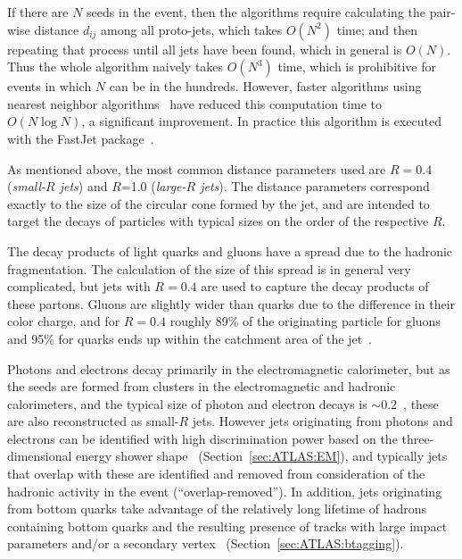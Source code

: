 If there are $N$ seeds in the event, then the \kt{} algorithms require calculating the pair-wise distance $d_{ij}$ among all proto-jets, which takes $O(N^2)$ time; and then repeating that process until all jets have been found, which in general is $O(N)$.
Thus the whole algorithm naively takes $O(N^3)$ time, which is prohibitive for events in which $N$ can be in the hundreds.
However, faster algorithms using nearest neighbor algorithms~\cite{Cacciari:2005hq} have reduced this computation time to $O(N\log N)$, a significant improvement.
In practice this algorithm is executed with the FastJet package~\cite{Cacciari:2011ma}.

As mentioned above, the most common distance parameters used are $R=0.4$ (\textit{small-$R$ jets}) and $R$=1.0 (\textit{large-$R$ jets}).
The distance parameters correspond exactly to the size of the circular cone formed by the jet, and are intended to target the decays of particles with typical sizes on the order of the respective $R$.

The decay products of light quarks and gluons have a spread due to the hadronic fragmentation.
The calculation of the size of this spread is in general very complicated, but jets with $R=0.4$ are used to capture the decay products of these partons.
Gluons are slightly wider than quarks due to the difference in their color charge, and for $R=0.4$ roughly 89\% of the originating particle \pt{} for gluons and 95\% for quarks ends up within the catchment area of the jet~\cite{Salam:2009jx}.

Photons and electrons decay primarily in the electromagnetic calorimeter, but as the seeds are formed from clusters in the electromagnetic and hadronic calorimeters, and the typical size of photon and electron decays is $\sim 0.2$~\cite{Aad:2019tso}, these are also reconstructed as small-$R$ jets.
However jets originating from photons and electrons can be identified with high discrimination power based on the three-dimensional energy shower shape~\cite{Aad:2019tso} (Section~\ref{sec:ATLAS:EM}), and typically jets that overlap with these are identified and removed from consideration of the hadronic activity in the event (``overlap-removed'').
In addition, jets originating from bottom quarks take advantage of the relatively long lifetime of hadrons containing bottom quarks and the resulting presence of tracks with large impact parameters and/or a secondary vertex~\cite{Aad:2015ydr,Aaboud:2018xwy,Aad:2019aic} (Section~\ref{sec:ATLAS:btagging}).

